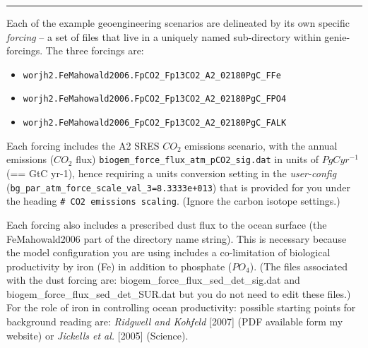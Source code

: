 \documentclass[11pt,fleqn]{book} %
\begin{document}
\vspace{1mm}
\noindent\rule{4cm}{0.1mm}
\vspace{2mm}

\noindent Each of the example geoengineering scenarios are delineated by its own specific \textit{forcing} – a set of files that live in a uniquely named sub-directory within \textsf{\footnotesize genie-forcings}. The three forcings are:

\vspace{1mm}
\begin{itemize}[noitemsep]
\item
\begin{verbatim}worjh2.FeMahowald2006.FpCO2_Fp13CO2_A2_02180PgC_FFe\end{verbatim}
\item
\begin{verbatim}worjh2.FeMahowald2006.FpCO2_Fp13CO2_A2_02180PgC_FPO4\end{verbatim}
\item
\begin{verbatim}worjh2.FeMahowald2006_FpCO2_Fp13CO2_A2_02180PgC_FALK\end{verbatim}
\end{itemize}
\vspace{1mm}

Each forcing includes the A2  SRES \(CO_{2}\) emissions scenario, with the annual emissions (\(CO_{2}\) flux) \texttt{biogem\_force\_flux\_atm\_pCO2\_sig.dat} in units of \(PgCyr^{-1}\) (== GtC yr-1), hence requiring a units conversion setting in the \textit{user-config} (\texttt{bg\_par\_atm\_force\_scale\_val\_3=8.3333e+013}) that is provided for you under the heading \texttt{\# CO2 emissions scaling}. (Ignore the carbon isotope settings.)

Each forcing also includes a prescribed dust flux to the ocean surface (the \textsf{\footnotesize FeMahowald2006} part of the directory name string). This is necessary because the model configuration you are using includes a co-limitation of biological productivity by iron (Fe) in addition to phosphate (\(PO_{4}\)). (The files associated with the dust forcing are: \textsf{\footnotesize biogem\_force\_flux\_sed\_det\_sig.dat} and \textsf{\footnotesize biogem\_force\_flux\_sed\_det\_SUR.dat} but you do not need to edit these files.) For the role of iron in controlling ocean productivity: possible starting points for background reading are: \textit{Ridgwell and Kohfeld} [2007] (PDF available form my website) or \textit{Jickells et al.} [2005] (Science).
\end{document}

